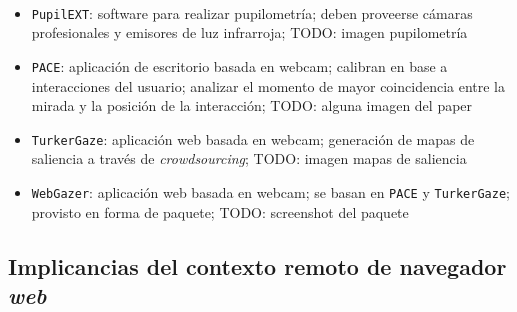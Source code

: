 \documentclass[aspectratio=169]{beamer}
\begin{document}
\begin{frame}{~}

  \begin{itemize}
    \item \texttt{PupilEXT}: software para realizar pupilometría; deben
      proveerse cámaras profesionales y emisores de luz infrarroja; TODO:
      imagen pupilometría

    \item \texttt{PACE}: aplicación de escritorio basada en webcam; calibran en
      base a interacciones del usuario; analizar el momento de mayor
      coincidencia entre la mirada y la posición de la interacción; TODO:
      alguna imagen del paper

    \item \texttt{TurkerGaze}: aplicación web basada en webcam; generación de
      mapas de saliencia a través de \textit{crowdsourcing}; TODO: imagen mapas
      de saliencia

    \item \texttt{WebGazer}: aplicación web basada en webcam; se basan en
      \texttt{PACE} y \texttt{TurkerGaze}; provisto en forma de paquete; TODO:
      screenshot del paquete

  \end{itemize}

\end{frame}

\subsection{Implicancias del contexto remoto de navegador \textit{web}}
\end{document}
